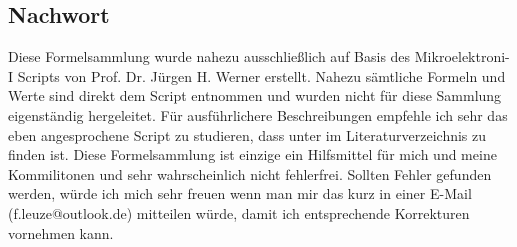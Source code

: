 \documentclass[12pt,a4paper]{report}%
\numberwithin{equation}{section}
\begin{document}
  \newpage
  \subsection{Nachwort}
  Diese Formelsammlung wurde nahezu ausschließlich auf Basis des Mikroelektroni-I Scripts von Prof. Dr. Jürgen H. Werner erstellt. Nahezu sämtliche Formeln und Werte sind direkt dem Script entnommen und wurden nicht für diese Sammlung eigenständig hergeleitet. Für ausführlichere Beschreibungen empfehle ich sehr das eben angesprochene Script zu studieren, dass unter \cite{Mikro1} im Literaturverzeichnis zu finden ist. Diese Formelsammlung ist einzige ein Hilfsmittel für mich und meine Kommilitonen und sehr wahrscheinlich nicht fehlerfrei. Sollten Fehler gefunden werden, würde ich mich sehr freuen wenn man mir das kurz in einer E-Mail (f.leuze@outlook.de) mitteilen würde, damit ich entsprechende Korrekturen vornehmen kann. 
  

\end{document}
